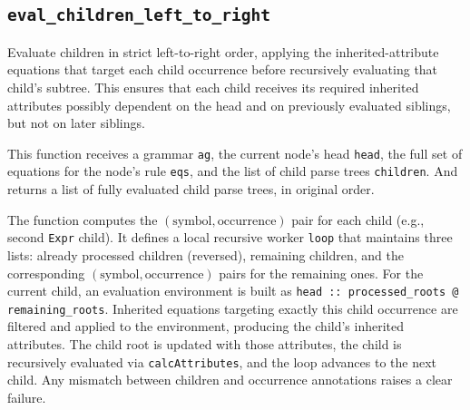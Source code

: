 \subsection{\texttt{eval\_children\_left\_to\_right}}

Evaluate children in strict left-to-right order, applying the inherited-attribute equations that target each child occurrence before recursively evaluating that 
child's subtree. This ensures that each child receives its required inherited attributes possibly dependent on the head and on previously evaluated siblings, 
but not on later siblings.

This function receives a grammar \texttt{ag}, the current node's head \texttt{head}, the full set of equations for the node's rule \texttt{eqs}, and the list 
of child parse trees \texttt{children}. And returns a list of fully evaluated child parse trees, in original order. 

The function computes the $(\text{symbol}, \text{occurrence})$ pair for each child (e.g., second \texttt{Expr} child). It defines a 
local recursive worker \texttt{loop} that maintains three lists: already processed children (reversed), 
remaining children, and the corresponding $(\text{symbol}, \text{occurrence})$ pairs for the remaining ones. For the current child, an evaluation 
environment is built as \texttt{head :: processed\_roots @ remaining\_roots}. Inherited equations targeting exactly this child occurrence are filtered and 
applied to the environment, producing the child's inherited attributes. The child root is updated with those attributes, the child is recursively evaluated 
via \texttt{calcAttributes}, and the loop advances to the next child. Any mismatch between children and occurrence annotations raises a clear failure.


